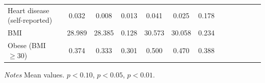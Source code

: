\documentclass[12pt,english]{article}
\begin{document}
\begin{table}[p]
\begin{center}
\begin{adjustbox}{max width=\linewidth}
\begin{threeparttable}
{\begin{tabular}{l*{6}{S S}}
						Heart disease (self-reported)      &     0.032&       0.008&       0.013&       0.041&       0.025&       0.178\\
						BMI     &        28.989&      28.385&       0.128&      30.573&      30.058&       0.234\\
						Obese (BMI $\geq 30$)&         0.374&       0.333&       0.301&       0.500&       0.470&       0.388\\
						\bottomrule
					\end{tabular}
					\begin{tablenotes}
						\item \footnotesize \textit{Notes} Mean values. \sym{*} \(p<0.10\), \sym{**} \(p<0.05\), \sym{***} \(p<0.01\).
					\end{tablenotes}
				}
			\end{threeparttable}
		\end{adjustbox}
	\end{center}
\end{table}
\clearpage
\end{document}
